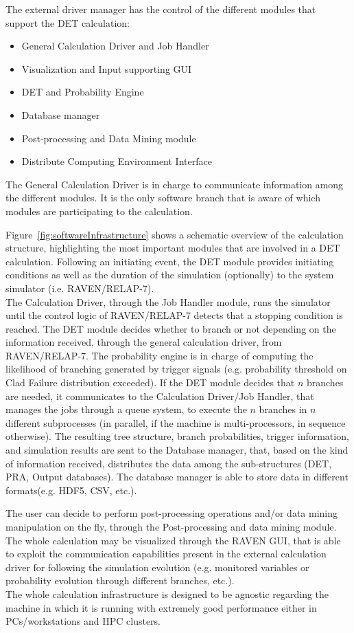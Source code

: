 The external driver manager has the control of the different modules that support the DET calculation:
\vspace{-5mm}
\begin{itemize}
\itemsep0em
\item General Calculation Driver and Job Handler
\item Visualization and Input supporting GUI
\item DET and Probability Engine
\item Database manager
\item Post-processing and Data Mining module
\item Distribute Computing Environment Interface
\end{itemize}
\vspace{-5mm}
The General Calculation Driver is in charge to communicate information among the different modules. It is the only software branch that is aware of which modules are participating to the calculation.   

Figure~\ref{fig:softwareInfrastructure} shows a schematic overview of the calculation structure, highlighting the most important modules that are involved in a DET calculation. Following an initiating event, the DET module provides initiating conditions as well as the duration of the simulation (optionally) to the system simulator (i.e. RAVEN/RELAP-7). 
\\The Calculation Driver, through the Job Handler module, runs the simulator until the control logic of RAVEN/RELAP-7 detects that a stopping condition is reached. The DET module decides whether to branch or not depending on the information received, through the general calculation driver, from RAVEN/RELAP-7. 
The probability engine is in charge of computing the likelihood of branching generated by trigger signals (e.g. probability threshold on Clad Failure distribution exceeded).  If the DET module decides that $n$ branches are needed, it communicates to the Calculation Driver/Job Handler, that manages the jobs through a queue system, to execute the $n$ branches in $n$ different subprocesses (in parallel, if the machine is multi-processors, in sequence otherwise). The resulting tree structure, branch probabilities, trigger information, and simulation results are sent to the Database manager, that, based on the kind of information received, distributes the data among the sub-structures (DET, PRA, Output databases). The database manager is able to store data in different formats(e.g. HDF5, CSV, etc.). 

The user can decide to perform post-processing operations and/or data mining manipulation on the fly, through the Post-processing and data mining module. The whole calculation may be visualized through the RAVEN GUI, that is able to exploit the communication capabilities present in the external calculation driver for following the simulation evolution (e.g. monitored variables or probability evolution through different branches, etc.). \\ The whole calculation infrastructure is designed to be agnostic regarding the machine in which it is running with extremely good performance either in PCs/workstations and HPC clusters. 
